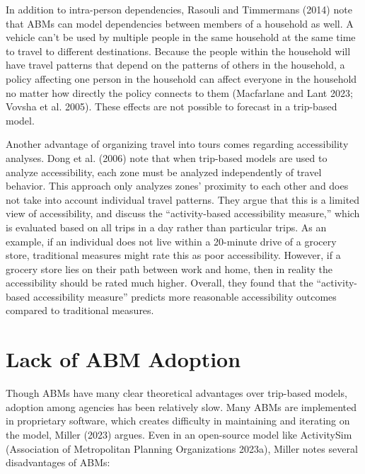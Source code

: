 \documentclass[fancy, oneside, mastersfancy, ms]{byuthesis}
\begin{document}
In addition to intra-person dependencies, Rasouli and Timmermans (2014)
note that ABMs can model dependencies between members of a household as
well. A vehicle can't be used by multiple people in the same household
at the same time to travel to different destinations. Because the people
within the household will have travel patterns that depend on the
patterns of others in the household, a policy affecting one person in
the household can affect everyone in the household no matter how
directly the policy connects to them (Macfarlane and Lant 2023; Vovsha
et al. 2005). These effects are not possible to forecast in a trip-based
model.

Another advantage of organizing travel into tours comes regarding
accessibility analyses. Dong et al. (2006) note that when trip-based
models are used to analyze accessibility, each zone must be analyzed
independently of travel behavior. This approach only analyzes zones'
proximity to each other and does not take into account individual travel
patterns. They argue that this is a limited view of accessibility, and
discuss the ``activity-based accessibility measure,'' which is evaluated
based on all trips in a day rather than particular trips. As an example,
if an individual does not live within a 20-minute drive of a grocery
store, traditional measures might rate this as poor accessibility.
However, if a grocery store lies on their path between work and home,
then in reality the accessibility should be rated much higher. Overall,
they found that the ``activity-based accessibility measure'' predicts
more reasonable accessibility outcomes compared to traditional measures.

\section{Lack of ABM Adoption}\label{sec-literature-lack-of-adpotion}

Though ABMs have many clear theoretical advantages over trip-based
models, adoption among agencies has been relatively slow. Many ABMs are
implemented in proprietary software, which creates difficulty in
maintaining and iterating on the model, Miller (2023) argues. Even in an
open-source model like ActivitySim (Association of Metropolitan Planning
Organizations 2023a), Miller notes several disadvantages of ABMs:
\end{document}
